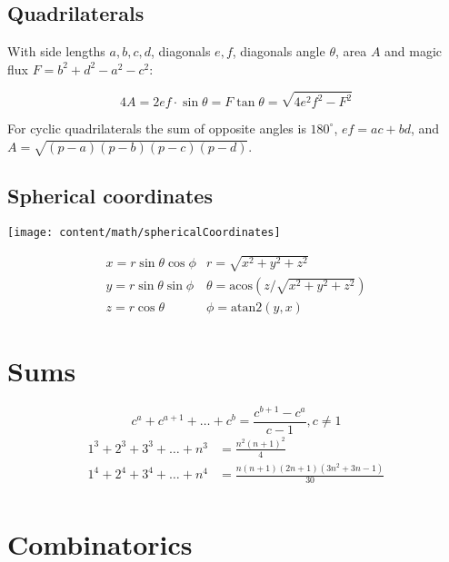 \documentclass{article}
\begin{document}
\subsection{Quadrilaterals}
With side lengths $a,b,c,d$, diagonals $e, f$, diagonals angle $\theta$, area $A$ and
magic flux $F=b^2+d^2-a^2-c^2$:

\[ 4A = 2ef \cdot \sin\theta = F\tan\theta = \sqrt{4e^2f^2-F^2} \]

 For cyclic quadrilaterals the sum of opposite angles is $180^\circ$,
$ef = ac + bd$, and $A = \sqrt{(p-a)(p-b)(p-c)(p-d)}$.

\subsection{Spherical coordinates}
\begin{center}
\texttt{[image: content/math/sphericalCoordinates]}
\end{center}
\[\begin{array}{cc}
x = r\sin\theta\cos\phi & r = \sqrt{x^2+y^2+z^2}\\
y = r\sin\theta\sin\phi & \theta = \textrm{acos}(z/\sqrt{x^2+y^2+z^2})\\
z = r\cos\theta & \phi = \textrm{atan2}(y,x)
\end{array}\]

\section{Sums}
\[ c^a + c^{a+1} + \dots + c^{b} = \frac{c^{b+1} - c^a}{c-1}, c \neq 1 \]
\begin{align*}
	1^3 + 2^3 + 3^3 + \dots + n^3 &= \frac{n^2(n+1)^2}{4} \\
	1^4 + 2^4 + 3^4 + \dots + n^4 &= \frac{n(n+1)(2n+1)(3n^2 + 3n - 1)}{30} \\
\end{align*}

\section{Combinatorics}
\end{document}
